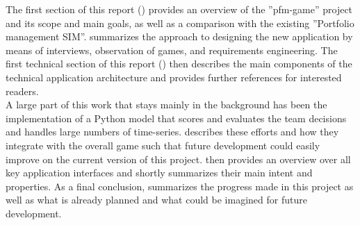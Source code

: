 The first section of this report () provides an overview of the ''pfm-game'' project and its scope and main goals, as well as a comparison with the existing ''Portfolio management SIM''.  summarizes the approach to designing the new application by means of interviews, observation of games, and requirements engineering. The first technical section of this report () then describes the main components of the technical application architecture and provides further references for interested readers. \\

A large part of this work that stays mainly in the background has been the implementation of a Python model that scores and evaluates the team decisions and handles large numbers of time-series.  describes these efforts and how they integrate with the overall game such that future development could easily improve on the current version of this project.  then provides an overview over all key application interfaces and shortly summarizes their main intent and properties. As a final conclusion,  summarizes the progress made in this project as well as what is already planned and what could be imagined for future development.